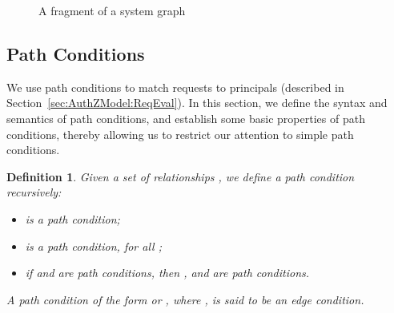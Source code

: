\documentclass{article}
\newtheorem{definition}{Definition}
\begin{document}
\begin{figure}[h]\centering
\caption{A fragment of a system graph}\label{img:system-graph-fragment}
\end{figure}



\subsection{Path Conditions}\label{sec:AuthZModel:PathConds}

We use path conditions to match requests to principals (described in Section~\ref{sec:AuthZModel:ReqEval}).
In this section, we define the syntax and semantics of path conditions, and establish some basic properties of path conditions, thereby allowing us to restrict our attention to simple path conditions.

\begin{definition}\label{def:path-condition}
   Given a set of relationships , we define a \emph{path condition} recursively:
    \begin{itemize}
	\item  is a path condition;
        \item  is a path condition, for all ;
        \item if  and  are path conditions, then ,  and  are path conditions.
    \end{itemize}
   A path condition of the form  or , where , is said to be an \emph{edge condition}.
\end{definition}
\end{document}
